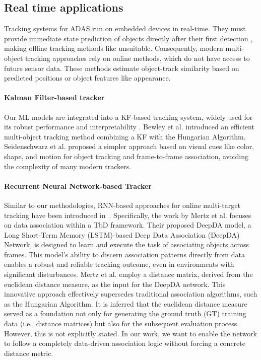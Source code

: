 \documentclass[letterpaper, 10 pt, journal, twoside]{IEEEtran}
\begin{document}
\subsection{Real time applications}
Tracking systems for ADAS run on embedded devices in real-time.
They must provide  immediate state prediction of objects directly after their first detection {\cite{KF_Bewley.2016,DL_Wojke.2017}}, making offline tracking methods like {\cite{offline_mot.2017}} unsuitable.
Consequently, modern multi-object tracking approaches rely on online methods, which do not have access to future sensor data. These methods estimate object-track similarity based on predicted positions or object features like appearance.

\paragraph{Kalman Filter-based tracker}
Our \ac{ML} models are integrated into a \ac{KF}-based tracking system, widely used for its robust performance and interpretability {\cite{KF_Wan.2000,KF_Ristic.2004,KF_Julier.2004,KF_framework.2013,KF_Bewley.2016,KF_simple_cues.2022,KF_BoundingBD.2023}}. Bewley et al. {\cite{KF_Bewley.2016}} introduced an efficient multi-object tracking method combining a KF with the Hungarian Algorithm. Seidenschwarz et al. {\cite{KF_simple_cues.2022}} proposed a simpler approach based on visual cues like color, shape, and motion for object tracking and frame-to-frame association, avoiding the complexity of many modern trackers.

\paragraph{Recurrent Neural Network-based Tracker}
Similar to our methodologies, RNN-based approaches for online multi-target tracking have been introduced in~{\cite{DL_RNN_mot.2016,DL_RNN_data_association.2019,DL_RNN_data_association.2020,liu2020deepmtt}}.
Specifically, the work by Mertz et al. {\cite{DL_RNN_data_association.2019}} focuses on data association within a \ac{TbD} framework.
Their proposed DeepDA model, a Long Short-Term Memory (LSTM)-based Deep Data Association (DeepDA) Network, is designed to learn and execute the task of associating objects across frames.
This model's ability to discern association patterns directly from data enables a robust and reliable tracking outcome, even in environments with significant disturbances.
Mertz et al. employ a distance matrix, derived from the euclidean distance measure, as the input for the DeepDA network.
This innovative approach effectively supersedes traditional association algorithms, such as the Hungarian Algorithm.
It is inferred that the euclidean distance measure served as a foundation not only for generating the ground truth (GT) training data (i.e., distance matrices) but also for the subsequent evaluation process.
However, this is not explicitly stated.
In our work, we want to enable the network to follow a completely data-driven association logic without forcing a concrete distance metric.
\end{document}
